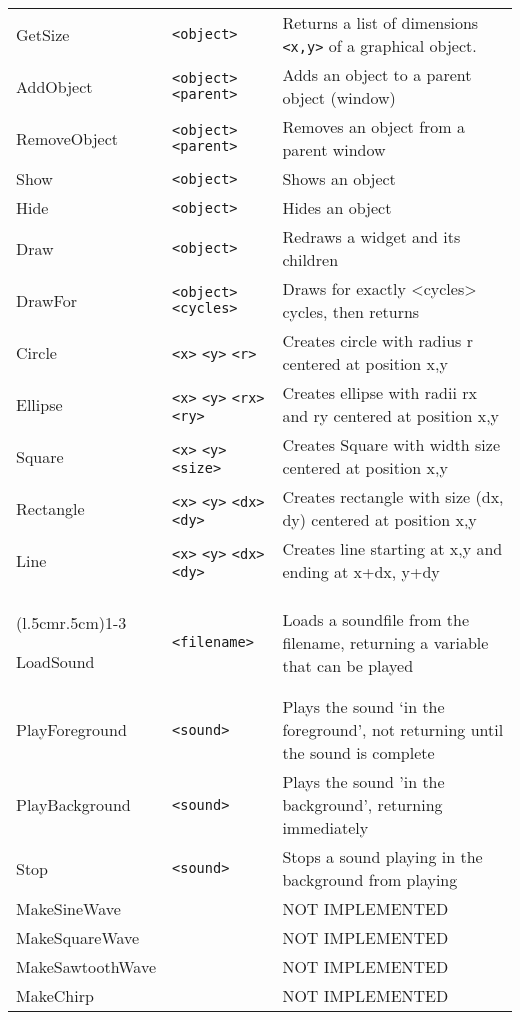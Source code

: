 \begin{longtable}{p{3cm}p{3cm}p{6cm}}
GetSize           &\verb+<object>+            &Returns a list of dimensions \verb+<x,y>+ of a graphical object.\\
AddObject   &\verb+<object>+ \verb+<parent>+  & Adds an object to a parent object (window)\\
RemoveObject&\verb+<object>+ \verb+<parent>+  &Removes an object from a parent window\\
Show        &\verb+<object>+                  &Shows an object\\
Hide        &\verb+<object>+                  &Hides an object\\
Draw        &\verb+<object>+                  &Redraws a widget and its children\\
DrawFor     &\verb+<object>+ \verb+<cycles>+  &Draws for exactly <cycles> cycles, then returns\\
Circle      &\verb+<x>+ \verb+<y>+ \verb+<r>+  &Creates circle with
radius r centered at position x,y\\
Ellipse     &\verb+<x>+ \verb+<y>+ \verb+<rx>+ \verb+<ry>+ &Creates
ellipse with radii rx and ry centered at position x,y\\
Square      &\verb+<x>+ \verb+<y>+ \verb+<size>+ &Creates Square with
width size centered at position x,y\\
Rectangle   &\verb+<x>+ \verb+<y>+ \verb+<dx>+  \verb+<dy>+ &Creates
rectangle with size (dx, dy) centered at position x,y\\
Line        &\verb+<x>+ \verb+<y>+ \verb+<dx>+  \verb+<dy>+ &Creates
line starting at x,y and ending at x+dx, y+dy\\


\addlinespace[0.2cm]
\midrule
\multicolumn{3}{c}{\textbf{Sound Objects Functions}}\\
\cmidrule(l{.5cm}r{.5cm}){1-3}


LoadSound      &\verb+<filename>+    &Loads a soundfile from the filename, returning a variable that can be played\\
PlayForeground &\verb+<sound>+       &Plays the sound `in the foreground', not returning until the sound is complete\\
PlayBackground &\verb+<sound>+       &Plays the sound 'in the  background', returning immediately\\
Stop           &\verb+<sound>+       &Stops a sound playing in the background from playing\\
MakeSineWave   &                     &      NOT IMPLEMENTED\\
MakeSquareWave &                     &      NOT IMPLEMENTED\\
MakeSawtoothWave &                   &      NOT IMPLEMENTED\\
MakeChirp        &                   &    NOT IMPLEMENTED\\



\end{longtable}
